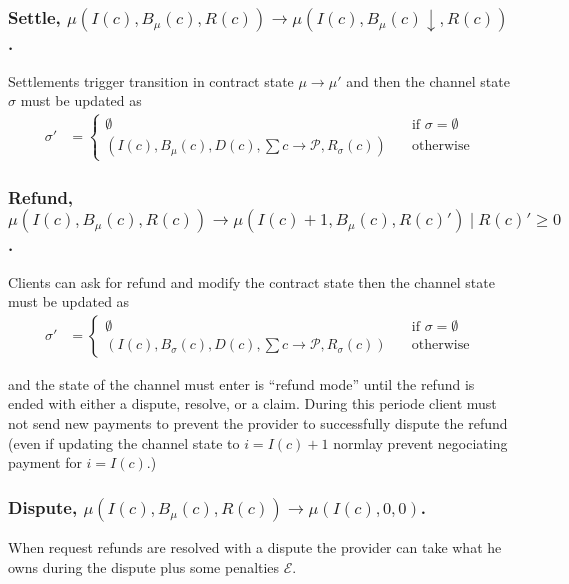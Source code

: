 \documentclass{llncs}
\begin{document}
\subsubsection{Settle, $\mu(I(c), B_\mu(c), R(c)) \rightarrow \mu(I(c), B_\mu(c) \downarrow, R(c))$.} Settlements trigger transition in contract state $\mu \rightarrow \mu'$ and then the channel state $\sigma$ must be updated as 
\begin{equation*}
\begin{split}
  \sigma' &=
  \begin{cases}
      \emptyset & \quad \text{if } \sigma = \emptyset \\
      (I(c), B_\mu(c), D(c), \textstyle \sum c \rightarrow \mathcal{P},R_\sigma(c)) & \quad \text{otherwise}
  \end{cases}
\end{split}
\end{equation*}

\subsubsection{Refund, $\mu(I(c), B_\mu(c), R(c)) \rightarrow \mu(I(c)+1, B_\mu(c), R(c)')\ |\ R(c)' \geq 0$.} Clients can ask for refund and modify the contract state then the channel state must be updated as
\begin{equation*}
\begin{split}
  \sigma' &=
  \begin{cases}
      \emptyset & \quad \text{if } \sigma = \emptyset \\
      (I(c), B_\sigma(c), D(c), \textstyle \sum c \rightarrow \mathcal{P}, R_\sigma(c)) & \quad \text{otherwise}
  \end{cases}
\end{split}
\end{equation*}

and the state of the channel must enter is ``refund mode'' until the refund is ended with either a dispute, resolve, or a claim. During this periode client must not send new payments to prevent the provider to successfully dispute the refund (even if updating the channel state to $i = I(c)+1$ normlay prevent negociating payment for $i = I(c)$.)

\subsubsection{Dispute, $\mu(I(c), B_\mu(c), R(c)) \rightarrow \mu(I(c), 0, 0)$.} When request refunds are resolved with a dispute the provider can take what he owns during the dispute plus some penalties $\mathcal{E}$. 
\end{document}
